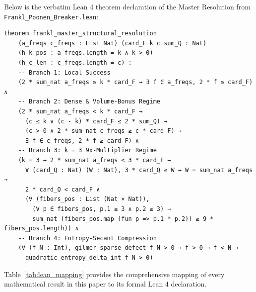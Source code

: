 \documentclass[11pt,a4paper]{article}
\theoremstyle{plain}
\theoremstyle{definition}
\theoremstyle{remark}
\begin{document}
Below is the verbatim Lean 4 theorem declaration of the Master Resolution from \texttt{Frankl\_Poonen\_Breaker.lean}:

\begin{lstlisting}[language=Lean]
theorem frankl_master_structural_resolution
    (a_freqs c_freqs : List Nat) (card_F k c sum_Q : Nat)
    (h_k_pos : a_freqs.length = k ∧ k > 0)
    (h_c_len : c_freqs.length = c) :
    -- Branch 1: Local Success
    (2 * sum_nat a_freqs ≥ k * card_F → ∃ f ∈ a_freqs, 2 * f ≥ card_F) ∧
    -- Branch 2: Dense & Volume-Bonus Regime
    (2 * sum_nat a_freqs < k * card_F →
      (c ≤ k ∨ (c - k) * card_F ≤ 2 * sum_Q) →
      (c > 0 ∧ 2 * sum_nat c_freqs ≥ c * card_F) →
      ∃ f ∈ c_freqs, 2 * f ≥ card_F) ∧
    -- Branch 3: k = 3 9x-Multiplier Regime
    (k = 3 → 2 * sum_nat a_freqs < 3 * card_F →
      ∀ (card_Q : Nat) (W : Nat), 3 * card_Q ≤ W → W = sum_nat a_freqs →
      2 * card_Q < card_F ∧
      (∀ (fibers_pos : List (Nat × Nat)),
        (∀ p ∈ fibers_pos, p.1 ≥ 3 ∧ p.2 ≥ 3) →
        sum_nat (fibers_pos.map (fun p => p.1 * p.2)) ≥ 9 * fibers_pos.length)) ∧
    -- Branch 4: Entropy-Secant Compression
    (∀ (f N : Int), gilmer_sparse_defect f N > 0 → f > 0 → f < N →
      quadratic_entropy_delta_int f N > 0)
\end{lstlisting}

Table~\ref{tab:lean_mapping} provides the comprehensive mapping of every mathematical result in this paper to its formal Lean 4 declaration.
\end{document}
